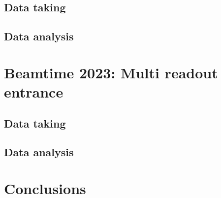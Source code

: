 \begin{refsection}
\subsection{Data taking}
\subsection{Data analysis}
\section{Beamtime 2023: Multi readout entrance}
\subsection{Data taking}
\subsection{Data analysis}

\section{Conclusions}

\printbibliography[
    heading = bibliographychapter,
    title=Bibliography on muEDM entrance detector
]

\end{refsection}